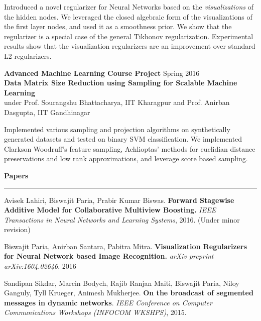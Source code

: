 \documentclass[10pt]{article}
\newcommand{\heading}[1]{
 {\large \textbf{#1}}
  \vspace{0.4em}
  \hrule
  \vspace{0.4em}
}
\newcommand{\EntryGap}{\vspace{0.5cm}}
\newcommand{\SmallEntryGap}{\vspace{0.2cm}}
\newcommand{\indentedpar}[1]{
  \hangindent=1cm \hangafter=0 #1
}
\begin{document}
\SmallEntryGap

\indentedpar{
    Introduced a novel regularizer for Neural Networks
    based on the \emph{visualizations} of the hidden nodes. 
    We leveraged the closed algebraic form of the
    visualizations of the first layer nodes, and used it as a smoothness prior.
    We show that the regularizer is a special case of the 
    general Tikhonov regularization. Experimental results show that the 
    visualization regularizers are an improvement over standard L2 regularizers.
}

\SmallEntryGap

\textbf{Advanced Machine Learning Course Project} \hfill Spring 2016 \\
\textbf{Data Matrix Size Reduction using Sampling for Scalable Machine Learning}\\
under Prof. Sourangshu Bhattacharya, IIT Kharagpur and Prof. Anirban Dasgupta, IIT Gandhinagar

\SmallEntryGap

\indentedpar{
  Implemented various sampling and projection algorithms on synthetically generated
  datasets and tested on binary SVM classification. We implemented Clarkson Woodruff's
  feature sampling, Achlioptas' methods for euclidian distance preservations and 
  low rank approximations, and leverage score based sampling.
}


\EntryGap

\heading{Papers}
  \SmallEntryGap
  Avisek Lahiri, Biswajit Paria, Prabir Kumar Biswas. 
  \textbf{Forward Stagewise Additive Model for Collaborative Multiview Boosting.}
  \emph{IEEE Transactions in Neural Networks and Learning Systems}, 2016.
  (Under minor revision)
  
  \SmallEntryGap
  Biswajit Paria, Anirban Santara, Pabitra Mitra.
  \textbf{Visualization Regularizers for Neural Network based Image Recognition.}
  \emph{arXiv preprint arXiv:1604.02646}, 2016
  
  \SmallEntryGap
  Sandipan Sikdar, Marcin Bodych, Rajib Ranjan Maiti, Biswajit Paria, 
  Niloy Ganguly, Tyll Krueger, Animesh Mukherjee.
  \textbf{On the broadcast of segmented messages in dynamic networks}.
  \emph{IEEE Conference on Computer Communications Workshops (INFOCOM WKSHPS)}, 2015.



\EntryGap
\end{document}
